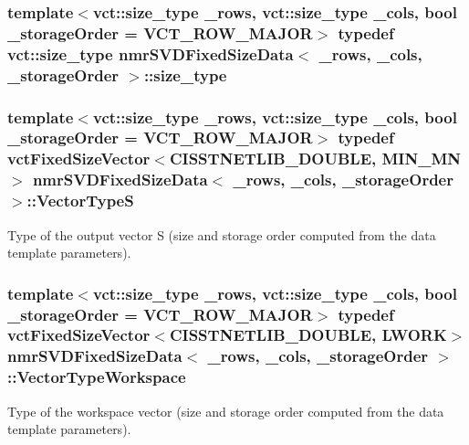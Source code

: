 \subsubsection[{size\+\_\+type}]{\setlength{\rightskip}{0pt plus 5cm}template$<$vct\+::size\+\_\+type \+\_\+rows, vct\+::size\+\_\+type \+\_\+cols, bool \+\_\+storage\+Order = V\+C\+T\+\_\+\+R\+O\+W\+\_\+\+M\+A\+J\+O\+R$>$ typedef {\bf vct\+::size\+\_\+type} {\bf nmr\+S\+V\+D\+Fixed\+Size\+Data}$<$ \+\_\+rows, \+\_\+cols, \+\_\+storage\+Order $>$\+::{\bf size\+\_\+type}}\label{classnmr_s_v_d_fixed_size_data_a2622c8b24534929513816ff92ac83216}
\hypertarget{classnmr_s_v_d_fixed_size_data_ad9ec4977d4726118af8c7bce3d18b752}{}
\subsubsection[{Vector\+Type\+S}]{\setlength{\rightskip}{0pt plus 5cm}template$<$vct\+::size\+\_\+type \+\_\+rows, vct\+::size\+\_\+type \+\_\+cols, bool \+\_\+storage\+Order = V\+C\+T\+\_\+\+R\+O\+W\+\_\+\+M\+A\+J\+O\+R$>$ typedef {\bf vct\+Fixed\+Size\+Vector}$<$C\+I\+S\+S\+T\+N\+E\+T\+L\+I\+B\+\_\+\+D\+O\+U\+B\+L\+E, {\bf M\+I\+N\+\_\+\+M\+N}$>$ {\bf nmr\+S\+V\+D\+Fixed\+Size\+Data}$<$ \+\_\+rows, \+\_\+cols, \+\_\+storage\+Order $>$\+::{\bf Vector\+Type\+S}}\label{classnmr_s_v_d_fixed_size_data_ad9ec4977d4726118af8c7bce3d18b752}
Type of the output vector S (size and storage order computed from the data template parameters). \hypertarget{classnmr_s_v_d_fixed_size_data_a82162baa88dba7eb39bb52b71435aaa9}{}
\subsubsection[{Vector\+Type\+Workspace}]{\setlength{\rightskip}{0pt plus 5cm}template$<$vct\+::size\+\_\+type \+\_\+rows, vct\+::size\+\_\+type \+\_\+cols, bool \+\_\+storage\+Order = V\+C\+T\+\_\+\+R\+O\+W\+\_\+\+M\+A\+J\+O\+R$>$ typedef {\bf vct\+Fixed\+Size\+Vector}$<$C\+I\+S\+S\+T\+N\+E\+T\+L\+I\+B\+\_\+\+D\+O\+U\+B\+L\+E, {\bf L\+W\+O\+R\+K}$>$ {\bf nmr\+S\+V\+D\+Fixed\+Size\+Data}$<$ \+\_\+rows, \+\_\+cols, \+\_\+storage\+Order $>$\+::{\bf Vector\+Type\+Workspace}}\label{classnmr_s_v_d_fixed_size_data_a82162baa88dba7eb39bb52b71435aaa9}
Type of the workspace vector (size and storage order computed from the data template parameters). 

